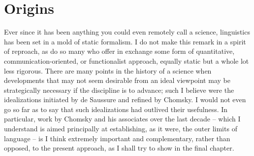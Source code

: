 \chapter{Origins} \label{ch:4}

Ever since it has been anything you could even remotely call a science, linguistics has been set in a mold of static formalism. I do not make this remark in a spirit of reproach, as do so many who offer in exchange some form of quantitative, communication-oriented, or functionalist approach, equally static but a whole lot less rigorous. There are many points in the history of a science when developments that may not seem desirable from an ideal viewpoint may be strategically necessary if the discipline is to advance; such I believe were the idealizations initiated by de Saussure and refined by Chomsky. I would not even go so far as to say that such idealizations had outlived their usefulness. In particular, work by Chomsky and his associates over the last decade -- which I understand is aimed principally at establishing, as it were, the outer limits of language -- is I think extremely important and complementary, rather than opposed, to the present approach, as I shall try to show in the final chapter.

